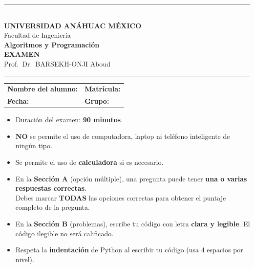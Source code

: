 \documentclass[12pt,a4paper]{article}
\begin{document}
\thispagestyle{fancy}

\begin{center}
  {\color{anahuacblue}\rule{\linewidth}{2pt}}\\[0.3cm]
  {\Large\bfseries UNIVERSIDAD ANÁHUAC MÉXICO}\\[0.1cm]
  {\large Facultad de Ingeniería}\\[0.1cm]
  {\large\bfseries Algoritmos y Programación}\\[0.2cm]
  {\LARGE\bfseries EXAMEN}\\[0.1cm]
  {\large Prof.\ Dr.\ BARSEKH-ONJI Aboud}\\[0.2cm]
  {\color{anahuacblue}\rule{\linewidth}{2pt}}
\end{center}

\vspace{0.4cm}

\noindent
\begin{tabularx}{\linewidth}{X X}
  \textbf{Nombre del alumno:} \hrulefill & \textbf{Matrícula:} \hrulefill \\[0.6cm]
  \textbf{Fecha:} \hrulefill & \textbf{Grupo:} \hrulefill \\[0.3cm]
\end{tabularx}

\vspace{0.3cm}

\begin{tcolorbox}[colback=anahuacblue!8, colframe=anahuacblue, title={\bfseries Instrucciones Generales}, fonttitle=\bfseries\color{white}]
\begin{itemize}[leftmargin=1.5em, itemsep=2pt]
  \item Duración del examen: \textbf{90 minutos}.
  \item \textbf{NO} se permite el uso de computadora, laptop ni teléfono inteligente de ningún tipo.
  \item Se permite el uso de \textbf{calculadora} si es necesario.
  \item En la \textbf{Sección A} (opción múltiple), una pregunta puede tener \textbf{una o varias respuestas correctas}. \\ Debes marcar \textbf{TODAS} las opciones correctas para obtener el puntaje completo de la pregunta.
  \item En la \textbf{Sección B} (problemas), escribe tu código con letra \textbf{clara y legible}. El código ilegible no será calificado.
  \item Respeta la \textbf{indentación} de Python al escribir tu código (usa 4 espacios por nivel).
\end{itemize}
\end{tcolorbox}
\end{document}
